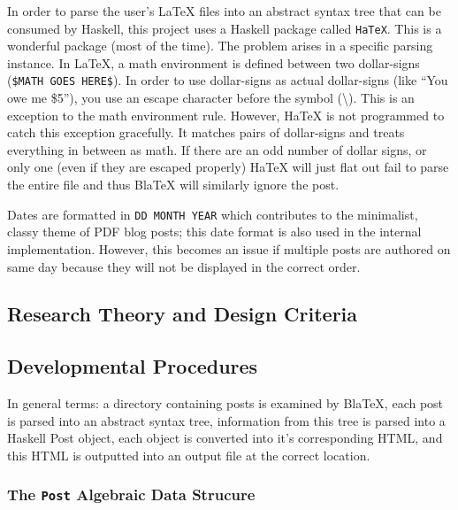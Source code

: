 \documentclass[doc,apacite,12pt]{apa6}
\begin{document}
In order to parse the user's LaTeX files into an abstract syntax tree that can be consumed by Haskell, this project uses a Haskell package called \texttt{HaTeX}. This is a wonderful package (most of the time). The problem arises in a specific parsing instance. In LaTeX, a math environment is defined between two dollar-signs (\texttt{\$MATH GOES HERE\$}). In order to use dollar-signs as actual dollar-signs (like ``You owe me \$5''), you use an escape character before the symbol (\textbackslash). This is an exception to the math environment rule. However, HaTeX is not programmed to catch this exception gracefully. It matches pairs of dollar-signs and treats everything in between as math. If there are an odd number of dollar signs, or only one (even if they are escaped properly) HaTeX will just flat out fail to parse the entire file and thus BlaTeX will similarly ignore the post. 

Dates are formatted in \texttt{DD MONTH YEAR} which contributes to the minimalist, classy theme of PDF blog posts; this date format is also used in the internal implementation. However, this becomes an issue if multiple posts are authored on same day because they will not be displayed in the correct order. 

\subsection{Research Theory and Design Criteria}

\subsection{Developmental Procedures}

In general terms: a directory containing posts is examined by BlaTeX, each post is parsed into an abstract syntax tree, information from this tree is parsed into a Haskell Post object, each object is converted into it's corresponding HTML, and this HTML is outputted into an output file at the correct location. 

\subsubsection{The \texttt{Post} Algebraic Data Strucure}
\end{document}
